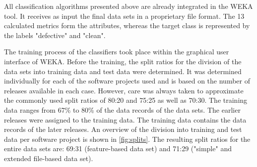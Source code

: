 All classification algorithms presented above are already integrated in the WEKA tool. It receives as input the final data sets in a proprietary file format. The 13 calculated metrics form the attributes, whereas the target class is represented by the labels "defective" and "clean".

The training process of the classifiers took place within the graphical user interface of WEKA. Before the training, the split ratios for the division of the data sets into training data and test data were determined. It was determined individually for each of the software projects used and is based on the number of releases available in each case. However, care was always taken to approximate the commonly used split ratios of 80:20 and 75:25 as well as 70:30. The training data ranges from 67\% to 80\% of the data records of the data sets. The earlier releases were assigned to the training data. The training data contains the data records of the later releases. An overview of the division into training and test data per software project is shown in \autoref{fig:splits}. The resulting split ratios for the entire data sets are: 69:31 (feature-based data set) and 71:29 ("simple" and extended file-based data set).

